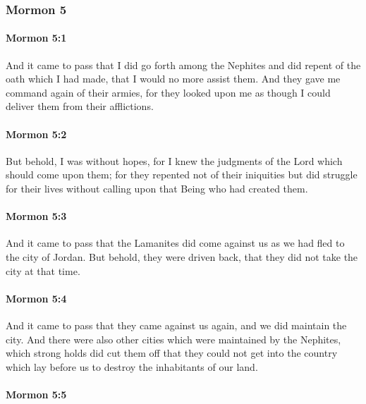 	\subsubsection{Mormon 5} %
		\label{MORMON-5}
		
		\paragraph{Mormon 5:1} %
			\label{MORMON-5-1}

			And it came to pass that I did go forth among the Nephites
			and did repent of the oath which I had made,
			that I would no more assist them.
			And they gave me command again of their armies,
			for they looked upon me
			as though I could deliver them from their afflictions.

		\paragraph{Mormon 5:2} %
			\label{MORMON-5-2}

			But behold, I was without hopes,
			for I knew the judgments of the Lord which should come upon them;
			for they repented not of their iniquities
			but did struggle for their lives
			without calling upon that Being who had created them.

		\paragraph{Mormon 5:3} %
			\label{MORMON-5-3}

			And it came to pass that the Lamanites did come against us
			as we had fled to the city of Jordan.
			But behold, they were driven back,
			that they did not take the city at that time.

		\paragraph{Mormon 5:4} %
			\label{MORMON-5-4}

			And it came to pass that they came against us again,
			and we did maintain the city.
			And there were also other cities which were maintained by the Nephites,
			which strong holds did cut them off
			that they could not get into the country which lay before us
			to destroy the inhabitants of our land.

		\paragraph{Mormon 5:5} %
			\label{MORMON-5-5}

